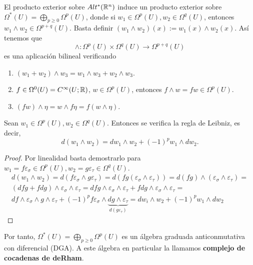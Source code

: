 \documentclass[CV.tex]{subfiles}
\begin{document}
El producto exterior sobre $Alt^*(\mathbb{R}^n)$ induce un producto exterior sobre $\Omega^*(U)=\bigoplus_{p\geq 0}\Omega^p(U)$, donde si $w_1\in\Omega^p(U),w_2\in\Omega^q(U)$, entonces $w_1\land w_2\in \Omega^{p+q}(U)$. Basta definir $(w_1\land w_2)(x):=w_1(x)\land w_2(x)$.  Así tenemos que
\[
\land: \Omega^p(U)\times\Omega^q(U)\to \Omega^{p+q}(U)
\]
es una aplicación bilineal verificando
\begin{enumerate}
\item $(w_1+w_2)\land w_3=w_1\land w_3+w_2\land w_3$.
\item $f\in\Omega^0(U)=C^{\infty}(U;\mathbb{R})$, $w\in\Omega^p(U)$, entonces $f\land w=fw\in\Omega^p(U)$. 
\item $(fw)\land \eta =w\land f\eta=f(w\land\eta)$. 
\end{enumerate}

\begin{lemma}
Sean $w_1\in\Omega^p(U), w_2\in\Omega^q(U)$. Entonces se verifica la regla de Leibniz, es decir, 
\[
d(w_1\land w_2)=dw_1\land w_2+(-1)^pw_1\land dw_2.
\]
\end{lemma}
\begin{proof}
Por linealidad basta demostrarlo para $w_1=f\varepsilon_{\sigma}\in\Omega^p(U), w_2=g\varepsilon_{\tau}\in\Omega^q(U)$. 
\begin{gather*}
d(w_1\land w_2)=d(f\varepsilon_{\sigma}\land g\varepsilon_{\tau})=d(fg(\varepsilon_{\sigma}\land\varepsilon_{\tau}))=d(fg)\land (\varepsilon_{\sigma}\land\varepsilon_{\tau})=\\
(dfg+fdg)\land \varepsilon_{\sigma}\land\varepsilon_{\tau}=dfg\land\varepsilon_{\sigma}\land\varepsilon_{\tau}+fdg\land\varepsilon_{\sigma}\land\varepsilon_{\tau}=\\
df\land\varepsilon_{\sigma}\land g\land\varepsilon_{\tau}+(-1)^pf\varepsilon_{\sigma}\land \underbrace{dg\land\varepsilon_{\tau}}_{d(g\varepsilon_{\tau})}=dw_i\land w_2+(-1)^pw_1\land dw_2
\end{gather*}
\end{proof}

Por tanto, $\Omega^*(U)=\bigoplus_{p\geq 0}\Omega^p(U)$ es un álgebra graduada anticonmutativa con diferencial (DGA). A este álgebra en particular la llamamos \textbf{complejo de cocadenas de deRham}.
\end{document}
